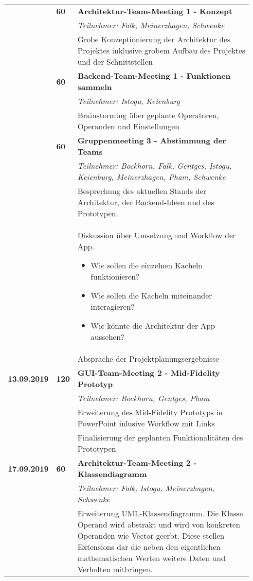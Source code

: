{{\begin{longtable}{|l|l|p{11cm}|}
		& \textbf{\hfill60} & \textbf{Architektur-Team-Meeting 1 - Konzept} 
			\\ & &
			\small{\textit{Teilnehmer: Falk, Meinerzhagen, Schwenke}}
			\\ & &
			Grobe Konzeptionierung der Architektur des Projektes inklusive grobem Aufbau des Projektes und der Schnittstellen  
		\\ \cline{2-3}
		& \textbf{\hfill60} & \textbf{Backend-Team-Meeting 1 - Funktionen sammeln} 
			\\ & &
			\small{\textit{Teilnehmer: Istogu, Keienburg}}
			\\ & &
			Brainstorming über geplante Operatoren, Operanden und Einstellungen
		\\ \cline{2-3}
		& \textbf{\hfill60} & \textbf{Gruppenmeeting 3 - Abstimmung der Teams} 
			\\ & &
			\small{\textit{Teilnehmer: Bockhorn, Falk, Gentges, Istogu, Keienburg, Meinerzhagen, Pham, Schwenke}}
			\\ & &
			Besprechung des aktuellen Stands der Architektur, der Backend-Ideen und des Prototypen.
			\\ & &
			Diskussion über Umsetzung und Workflow der App.
			\begin{itemize}\renewcommand\labelitemi{--}
				\item  Wie sollen die einzelnen Kacheln funktionieren?
				\item Wie sollen die Kacheln miteinander interagieren?
				\item Wie könnte die Architektur der App aussehen?
			\end{itemize}
			\\ & &
			Absprache der Projektplanungsergebnisse
	\\\hline
		\textbf{13.09.2019} 
			& \hfill\textbf{120} & \textbf{GUI-Team-Meeting 2 - Mid-Fidelity Prototyp} 
			\\ & &
			\small{\textit{Teilnehmer: Bockhorn, Gentges, Pham}}
			\\ & &
			Erweiterung des Mid-Fidelity Prototyps in PowerPoint inlusive Workflow mit Links
			\\ & &
			Finalisierung der geplanten Funktionalitäten des Prototypen
	\\\hline
		\textbf{17.09.2019} 
			& \hfill \textbf{ 60} & \textbf{Architektur-Team-Meeting 2 - Klassendiagramm}
			\\ & &
			\small{\textit{Teilnehmer: Falk, Istogu, Meinerzhagen, Schwenke}}
			\\ & &
			Erweiterung UML-Klassendiagramm. Die Klasse Operand wird abstrakt und wird von konkreten Operanden wie Vector geerbt. Diese stellen Extensions dar die neben den eigentlichen mathematischen Werten weitere Daten und Verhalten mitbringen.

\end{longtable}}}
